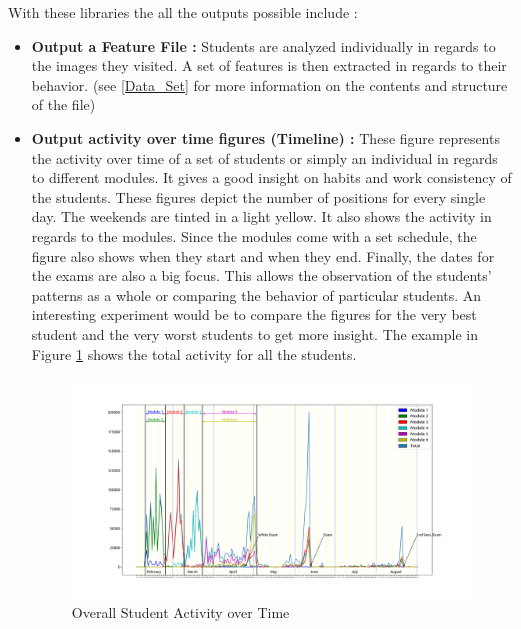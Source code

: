 \documentclass[a4paper,11pt]{report}
\numberwithin{figure}{chapter} %
\begin{document}
    With these libraries the all the outputs possible include :

    \begin{itemize}
        \item[\textbullet] \textbf{Output a Feature File :} Students are analyzed individually in regards to the images they visited.
        A set of features is then extracted in regards to their behavior.
        (see \ref{Data_Set} for more information on the contents and structure of the file)
        \item[\textbullet] \textbf{Output activity over time figures (Timeline) :} These figure represents the activity over time of a set of students or simply an individual in regards to different modules.
        It gives a good insight on habits and work consistency of the students.
        These figures depict the number of positions for every single day.
        The weekends are tinted in a light yellow.
        It also shows the activity in regards to the modules.
        Since the modules come with a set schedule, the figure also shows when they start and when they end.
        Finally, the dates for the exams are also a big focus.
        This allows the observation of the students' patterns as a whole or comparing the behavior of particular students.
        An interesting experiment would be to compare the figures for the very best student and the very worst students to get more insight.
        The example in Figure \ref{fig:timelapse} shows the total activity for all the students.
        \begin{figure}[H]
        \centering
        \includegraphics[width=.99\linewidth]{images/timelapse.png}
        \caption{Overall Student Activity over Time}
        \label{fig:timelapse}
        \end{figure}


\end{itemize}
\end{document}
